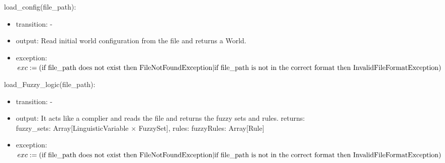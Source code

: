 \documentclass[12pt, titlepage]{article}
\begin{document}
\noindent load\_config(file\_path):
\begin{itemize}
\item transition: -
\item output: Read initial world configuration from the file and returns a
      World.
\item exception:
      $exc := ( \\
      \text{if } \text{file\_path} \text{ does not exist then }
      \text{FileNotFoundException} \\
      | \\
      \text{if } \text{file\_path} \text{ is not in the correct format then }
      \text{InvalidFileFormatException} \\
      )$
\end{itemize}

\noindent load\_Fuzzy\_logic(file\_path):
\begin{itemize}
\item transition: -
\item output: It acts like a complier and reads the file and returns the 
      fuzzy sets and rules. returns: \\
      fuzzy\_sets: Array[LinguisticVariable $\times$ FuzzySet], rules: fuzzyRules: Array[Rule]
\item exception: 
      $exc := ( \\
      \text{if } \text{file\_path} \text{ does not exist then }
      \text{FileNotFoundException} \\
      | \\
      \text{if } \text{file\_path} \text{ is not in the correct format then }
      \text{InvalidFileFormatException} \\
      )$
\end{itemize}




\end{document}
